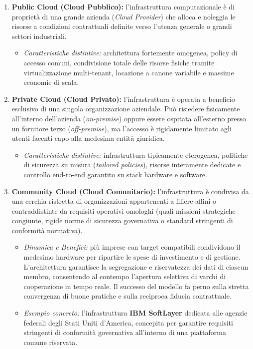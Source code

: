 \documentclass[11pt, a4paper]{article}
\begin{document}
\begin{enumerate}
    \item \textbf{Public Cloud (Cloud Pubblico):} l'infrastruttura computazionale è di proprietà di una grande azienda (\emph{Cloud Provider}) che alloca e noleggia le risorse a condizioni contrattuali definite verso l'utenza generale o grandi settori industriali.
    \begin{itemize}[noitemsep]
        \item \emph{Caratteristiche distintive:} architettura fortemente omogenea, policy di accesso comuni, condivisione totale delle risorse fisiche tramite virtualizzazione multi-tenant, locazione a canone variabile e massime economie di scala.
    \end{itemize}

    \item \textbf{Private Cloud (Cloud Privato):} l'infrastruttura è operata a beneficio esclusivo di una singola organizzazione aziendale. Può risiedere fisicamente all'interno dell'azienda (\emph{on-premise}) oppure essere ospitata all'esterno presso un fornitore terzo (\emph{off-premise}), ma l'accesso è rigidamente limitato agli utenti facenti capo alla medesima entità giuridica.
    \begin{itemize}[noitemsep]
        \item \emph{Caratteristiche distintive:} infrastruttura tipicamente eterogenea, politiche di sicurezza su misura (\emph{tailored policies}), risorse interamente dedicate e controllo end-to-end garantito su stack hardware e software.
    \end{itemize}

    \item \textbf{Community Cloud (Cloud Comunitario):} l'infrastruttura è condivisa da una cerchia ristretta di organizzazioni appartenenti a filiere affini o contraddistinte da requisiti operativi omologhi (quali missioni strategiche congiunte, rigide norme di sicurezza governativa o standard stringenti di conformità normativa).
    \begin{itemize}[noitemsep]
        \item \emph{Dinamica e Benefici:} più imprese con target compatibili condividono il medesimo hardware per ripartire le spese di investimento e di gestione. L'architettura garantisce la segregazione e riservatezza dei dati di ciascun membro, consentendo al contempo l'apertura selettiva di varchi di cooperazione in tempo reale. Il successo del modello fa perno sulla stretta convergenza di buone pratiche e sulla reciproca fiducia contrattuale.
        \item \emph{Esempio concreto:} l'infrastruttura \textbf{IBM SoftLayer} dedicata alle agenzie federali degli Stati Uniti d'America, concepita per garantire requisiti stringenti di conformità governativa all'interno di una piattaforma comune riservata.
    \end{itemize}


\end{enumerate}
\end{document}
